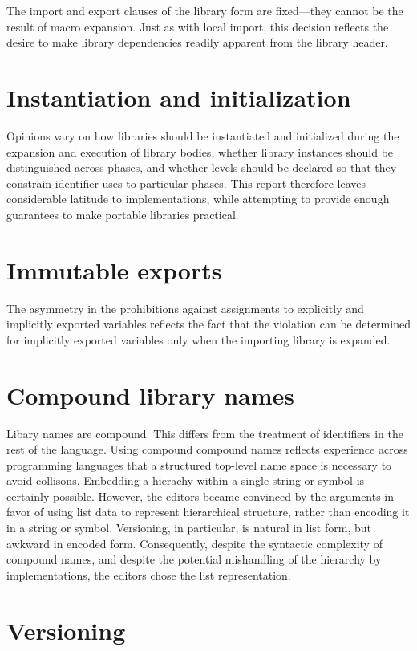 \documentclass[twoside,twocolumn]{algol60}
\begin{document}
The {\cf import} and {\cf export} clauses of the {\cf library} form
are fixed---they cannot be the result of macro expansion.  Just as
with local import, this decision reflects the desire to make library
dependencies readily apparent from the library header.

\section{Instantiation and initialization}

Opinions vary on how libraries should be instantiated and
initialized during the expansion and execution of library bodies,
whether library instances should be distinguished across phases,
and whether levels should be declared so that they constrain 
identifier uses to particular phases. This report therefore leaves
considerable latitude to implementations, while attempting to
provide enough guarantees to make portable libraries practical.

\section{Immutable exports}

The asymmetry in the prohibitions against assignments to explicitly
and implicitly exported variables reflects the fact that the violation
can be determined for implicitly exported variables only when the
importing library is expanded.

\section{Compound library names}

Libary names are compound.  This differs from the treatment of
identifiers in the rest of the language.  Using compound compound
names reflects experience across programming languages that a
structured top-level name space is necessary to avoid collisons.
Embedding a hierachy within a single string or symbol is certainly
possible. However, the editors became convinced by the arguments in
favor of using list data to represent hierarchical structure, rather
than encoding it in a string or symbol.  Versioning, in particular, is
natural in list form, but awkward in encoded form.  Consequently,
despite the syntactic complexity of compound names, and despite the
potential mishandling of the hierarchy by implementations, the editors
chose the list representation.

\section{Versioning}
\end{document}
